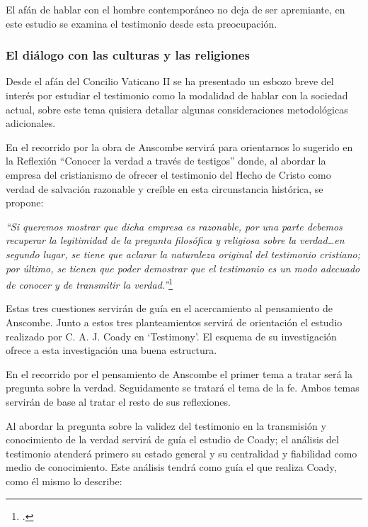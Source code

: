 \documentclass[11pt]{article}
\begin{document}
El afán de hablar con el hombre contemporáneo no deja de ser apremiante, en este estudio se examina el testimonio desde esta preocupación. 

\subsubsection{El diálogo con las culturas y las religiones}
Desde el afán del Concilio Vaticano II se ha presentado un esbozo breve del interés por estudiar el testimonio como la modalidad de hablar con la sociedad actual, sobre este tema quisiera detallar algunas consideraciones metodológicas adicionales.

En el recorrido por la obra de Anscombe servirá para orientarnos lo sugerido en la Reflexión ``Conocer la verdad a través de testigos'' donde, al abordar la empresa del cristianismo de ofrecer el testimonio del Hecho de Cristo como verdad de salvación razonable y creíble en esta circunstancia histórica, se propone:

\emph{
``Si queremos mostrar que dicha empresa es razonable, por una parte debemos recuperar la legitimidad de la pregunta filosófica y religiosa sobre la verdad\ldots en segundo lugar, se tiene que aclarar la naturaleza original del testimonio cristiano; por último, se tienen que poder demostrar que el testimonio es un modo adecuado de conocer y de transmitir la verdad.''}\footcite[267]{pradesmulticr}

Estas tres cuestiones servirán de guía en el acercamiento al pensamiento de Anscombe. Junto a estos tres planteamientos servirá de orientación el estudio realizado por C. A. J. Coady en `Testimony'. El esquema de su investigación ofrece a esta investigación una buena estructura.  

En el recorrido por el pensamiento de Anscombe el primer tema a tratar será la pregunta sobre la verdad. Seguidamente se tratará el tema de la fe. Ambos temas servirán de base al tratar el resto de sus reflexiones.

Al abordar la pregunta sobre la validez del testimonio en la transmisión y conocimiento de la verdad servirá de guía el estudio de Coady; el análisis del testimonio atenderá primero su estado general y su centralidad y fiabilidad como medio de conocimiento. Este análisis tendrá como guía el que realiza Coady, como él mismo lo describe:
\end{document}
